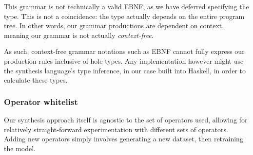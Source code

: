 \documentclass{article}
\begin{document}
This grammar is not technically a valid EBNF,
as we have deferred specifying the type.
This is not a coincidence: the type actually depends on the entire program tree.
In other words, our grammar productions are dependent on context,
meaning our grammar is not actually \emph{context-free}.

As such, context-free grammar notations such as EBNF cannot
fully express our production rules inclusive of hole types.
Any implementation however might use the synthesis language's type inference,
in our case built into Haskell, in order to calculate these types.




\subsubsection{Operator whitelist}

Our synthesis approach itself is agnostic to the set of operators used,
allowing for relatively straight-forward experimentation with different sets of operators.
Adding new operators simply involves generating a new dataset, then retraining the model.
\end{document}
